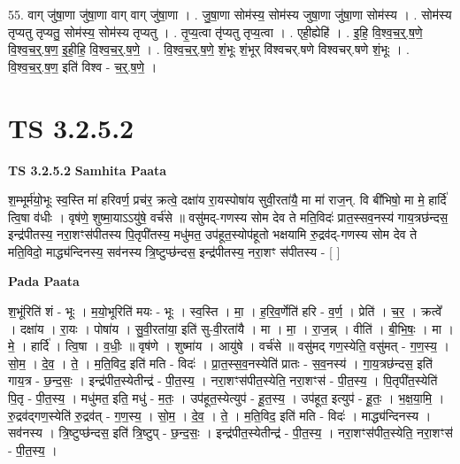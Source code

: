 \documentclass[17pt]{extarticle}
\begin{document}
55. वाग् जु॑षा॒णा जु॑षा॒णा वाग् वाग् जु॑षा॒णा । . जु॒षा॒णा सोम॑स्य॒ सोम॑स्य जुषा॒णा जु॑षा॒णा सोम॑स्य । . सोम॑स्य तृप्यतु तृप्यतु॒ सोम॑स्य॒ सोम॑स्य तृप्यतु । . तृ॒प्य॒त्वा तृ॑प्यतु तृप्य॒त्वा । . एही॒ह्येहि॑ । . इ॒हि॒ वि॒श्व॒च॒र्॒.ष॒णे॒ वि॒श्व॒च॒र्॒.ष॒ण॒ इ॒ही॒हि॒ वि॒श्व॒च॒र्॒.ष॒णे॒ । . वि॒श्व॒च॒र्॒.ष॒णे॒ शं॒भूः शं॒भूर् वि॑श्वचर्.षणे विश्वचर्.षणे शं॒भूः । . वि॒श्व॒च॒र्॒.ष॒ण॒ इति॑ विश्व - च॒र्॒.ष॒णे॒ । \newline


\section{ TS 3.2.5.2 }

\textbf{TS 3.2.5.2 } \newline
\textbf{Samhita Paata} \newline

श॒म्भूर्म॑यो॒भूः स्व॒स्ति मा॑ हरिवर्ण॒ प्रच॑र॒ क्रत्वे॒ दक्षा॑य रा॒यस्पोषा॑य सुवी॒रता॑यै॒ मा मा॑ राज॒न्. वि बी॑भिषो॒ मा मे॒ हार्दि॑ त्वि॒षा व॑धीः । वृष॑णे॒ शुष्मा॒याऽऽयु॑षे॒ वर्च॑से ॥ वसु॑मद्-गणस्य सोम देव ते मति॒विदः॑ प्रात॒स्सव॒नस्य॑ गाय॒त्रछ॑न्दस॒ इन्द्र॑पीतस्य॒ नरा॒शꣳस॑पीतस्य पि॒तृपी॑तस्य॒ मधु॑मत॒ उप॑हूत॒स्योप॑हूतो भक्षयामि रु॒द्रव॑द्-गणस्य सोम देव ते मति॒विदो॒ माद्ध्य॑न्दिनस्य॒ सव॑नस्य त्रि॒ष्टुप्छ॑न्दस॒ इन्द्र॑पीतस्य॒ नरा॒शꣳ स॑पीतस्य - [  ] \newline

\textbf{Pada Paata} \newline

श॒भूंरिति॑ शं - भूः । म॒यो॒भूरिति॑ मयः - भूः । स्व॒स्ति । मा॒ । ह॒रि॒व॒र्णेति॑ हरि - व॒र्ण॒ । प्रेति॑ । च॒र॒ । क्रत्वे᳚ । दक्षा॑य । रा॒यः । पोषा॑य । सु॒वी॒रता॑या॒ इति॑ सु-वी॒रता॑यै । मा । मा॒ । रा॒ज॒न्न् । वीति॑ । बी॒भि॒षः॒ । मा । मे॒ । हार्दि॑ । त्वि॒षा । व॒धीः॒ ॥ वृष॑णे । शुष्मा॑य । आयु॑षे । वर्च॑से ॥ वसु॑मद् गण॒स्येति॒ वसु॑मत् - ग॒ण॒स्य॒ । सो॒म॒ । दे॒व॒ । ते॒ । म॒ति॒विद॒ इति॑ मति - विदः॑ । प्रा॒त॒स्स॒व॒नस्येति॑ प्रातः - स॒व॒नस्य॑ । गा॒य॒त्रछ॑न्दस॒ इति॑ गाय॒त्र - छ॒न्द॒सः॒ । इन्द्र॑पीत॒स्येतीन्द्र॑ - पी॒त॒स्य॒ । नरा॒शꣳस॑पीत॒स्येति॒ नरा॒शꣳस॑ - पी॒त॒स्य॒ । पि॒तृपी॑त॒स्येति॑ पि॒तृ - पी॒त॒स्य॒ । मधु॑मत॒ इति॒ मधु॑ - म॒तः॒ । उप॑हूत॒स्येत्युप॑ - हू॒त॒स्य॒ । उप॑हूत॒ इत्युप॑ - हू॒तः॒ । भ॒क्ष॒या॒मि॒ । रु॒द्रव॑द्गण॒स्येति॑ रु॒द्रव॑त् - ग॒ण॒स्य॒ । सो॒म॒ । दे॒व॒ । ते॒ । म॒ति॒विद॒ इति॑ मति - विदः॑ । माद्ध्य॑न्दिनस्य । सव॑नस्य । त्रि॒ष्टुप्छ॑न्दस॒ इति॑ त्रि॒ष्टुप् - छ॒न्द॒सः॒ । इन्द्र॑पीत॒स्येतीन्द्र॑ - पी॒त॒स्य॒ । नरा॒शꣳस॑पीत॒स्येति॒ नरा॒शꣳस॑ - पी॒त॒स्य॒ ।  \newline
\end{document}
